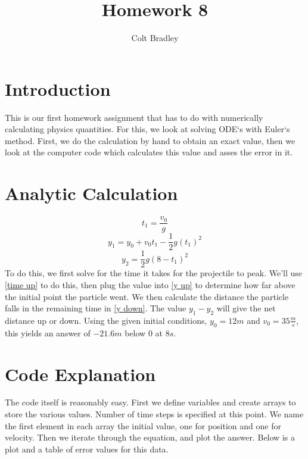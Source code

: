 \documentclass[11pt]{article}
\begin{document}
\title{Homework 8}
\author{Colt Bradley}
\date{}

\maketitle

\section{Introduction}
This is our first homework assignment that has to do with numerically calculating physics quantities. For this, we look at solving ODE`s with Euler`s method. First, we do the calculation by hand to obtain an exact value, then we look at the computer code which calculates this value and asses the error in it. 

\section{Analytic Calculation}
\begin{equation}
t_1 = \frac{v_0}{g} \label{time up}
\end{equation}
\begin{equation}
y_1 =y_0 + v_0 t_1 - \frac{1}{2}g (t_1)^2 \label{y up}
\end{equation}
\begin{equation}
y_2 = \frac{1}{2} g (8-t_1)^2 \label{y down}
\end{equation}
To do this, we first solve for the time it takes for the projectile to peak. We'll use \ref{time up} to do this, then plug the value into \ref{y up} to determine how far above the initial point the particle went. We then calculate the distance the particle falls in the remaining time in \ref{y down}. The value $y_1 - y_2$ will give the net distance up or down. Using the given initial conditions, $y_0 = 12 m$ and $v_0 = 35 \frac{m}{s}$, this yields an answer of $-21.6 m$ below $0$ at $8s$.



\section{Code Explanation}
The code itself is reasonably easy. First we define variables and create arrays to store the various values. Number of time steps is specified at this point. We name the first element in each array the initial value, one for position and one for velocity. Then we iterate through the equation, and plot the answer. Below is a plot and a table of error values for this data. 
\end{document}
